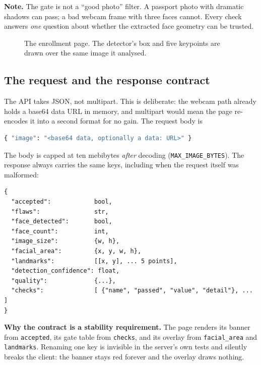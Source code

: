 \documentclass[11pt,a4paper]{article}
\newcommand{\coden}[1]{\texttt{\small #1}}
\begin{document}
\begin{keybox}
\textbf{Note.} The gate is not a ``good photo'' filter. A passport
photo with dramatic shadows can pass; a bad webcam frame with three
faces cannot. Every check answers \emph{one} question about whether the
extracted face geometry can be trusted.
\end{keybox}

\begin{figure}[H]
  \centering
  \caption{The enrollment page. The detector's box and five keypoints are
  drawn over the same image it analysed.}
  \label{fig:page}
\end{figure}

\subsection{The request and the response contract}
\label{sec:contract}

The API takes JSON, not multipart. This is deliberate: the webcam path
already holds a base64 data URL in memory, and multipart would mean the
page re-encodes it into a second format for no gain. The request body is

\begin{lstlisting}[language=Python]
{ "image": "<base64 data, optionally a data: URL>" }
\end{lstlisting}

The body is capped at ten mebibytes \emph{after} decoding
(\coden{MAX\_IMAGE\_BYTES}). The response always carries the same keys,
including when the request itself was malformed:

\begin{lstlisting}
{
  "accepted":            bool,
  "flaws":               str,
  "face_detected":       bool,
  "face_count":          int,
  "image_size":          {w, h},
  "facial_area":         {x, y, w, h},
  "landmarks":           [[x, y], ... 5 points],
  "detection_confidence": float,
  "quality":             {...},
  "checks":              [ {"name", "passed", "value", "detail"}, ... ]
}
\end{lstlisting}

\begin{warnbox}
\textbf{Why the contract is a stability requirement.} The page renders
its banner from \coden{accepted}, its gate table from \coden{checks}, and
its overlay from \coden{facial\_area} and \coden{landmarks}. Renaming one
key is invisible in the server's own tests and silently breaks the
client: the banner stays red forever and the overlay draws nothing.
\end{warnbox}
\end{document}
